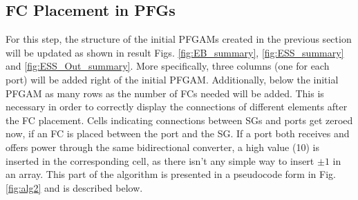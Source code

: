 \documentclass[conference]{IEEEtran}
\begin{document}
\subsection{FC Placement in PFGs}
For this step, the structure of the initial PFGAMs created in the previous section will be updated as shown in result Figs. \ref{fig:EB_summary}, \ref{fig:ESS_summary} and \ref{fig:ESS_Out_summary}. More specifically, three columns (one for each port) will be added right of the initial PFGAM. Additionally, below the initial PFGAM as many rows as the number of FCs needed will be added. This is necessary in order to correctly display the connections of different elements after the FC placement. Cells indicating connections between SGs and ports get zeroed now, if an FC is placed between the port and the SG. If a port both receives and offers power through the same bidirectional converter, a high value (10) is inserted in the corresponding cell, as there isn't any simple way to insert $\pm1$ in an array. This part of the algorithm is presented in a pseudocode form in Fig. \ref{fig:alg2} and is described below. 
\end{document}
